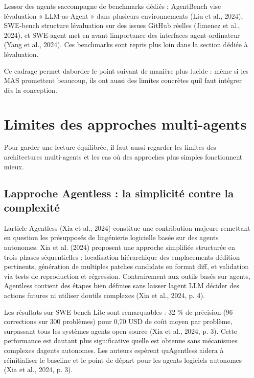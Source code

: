 \documentclass[12pt,a4paper]{article}
\begin{document}
L\textquotesingle essor des agents s\textquotesingle accompagne de
benchmarks dédiés : AgentBench vise l\textquotesingle évaluation «
LLM-as-Agent » dans plusieurs environnements (Liu et al., 2024),
SWE-bench structure l\textquotesingle évaluation sur des issues GitHub
réelles (Jimenez et al., 2024), et SWE-agent met en avant
l\textquotesingle importance des interfaces agent-ordinateur (Yang et
al., 2024). Ces benchmarks sont repris plus loin dans la section dédiée
à l\textquotesingle évaluation.

Ce cadrage permet d\textquotesingle aborder le point suivant de manière
plus lucide : même si les MAS promettent beaucoup, ils ont aussi des
limites concrètes qu\textquotesingle il faut intégrer dès la conception.

\section{Limites des approches
multi-agents}\label{limites-des-approches-multi-agents}

Pour garder une lecture équilibrée, il faut aussi regarder les limites
des architectures multi-agents et les cas où des approches plus simples
fonctionnent mieux.

\subsection{L\textquotesingle approche Agentless : la simplicité contre
la
complexité}\label{lapproche-agentless--la-simplicituxe9-contre-la-complexituxe9}

L\textquotesingle article Agentless (Xia et al., 2024) constitue une
contribution majeure remettant en question les présupposés de
l\textquotesingle ingénierie logicielle basée sur des agents autonomes.
Xia et al. (2024) proposent une approche simplifiée structurée en trois
phases séquentielles : localisation hiérarchique des emplacements
d\textquotesingle édition pertinents, génération de multiples patches
candidats en format diff, et validation via tests de reproduction et
régression. Contrairement aux outils basés sur agents, Agentless
contient des étapes bien définies sans laisser l\textquotesingle agent
LLM décider des actions futures ni utiliser d\textquotesingle outils
complexes (Xia et al., 2024, p. 4).

Les résultats sur SWE-bench Lite sont remarquables : 32 \% de précision
(96 corrections sur 300 problèmes) pour 0,70 USD de coût moyen par
problème, surpassant tous les systèmes agents open source (Xia et al.,
2024, p. 3). Cette performance est d\textquotesingle autant plus
significative qu\textquotesingle elle est obtenue sans mécanismes
complexes d\textquotesingle agents autonomes. Les auteurs espèrent
qu\textquotesingle Agentless aidera à réinitialiser le baseline et le
point de départ pour les agents logiciels autonomes (Xia et al., 2024,
p. 3).
\end{document}
